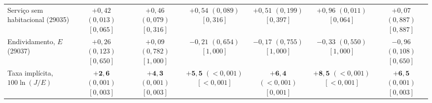 \documentclass[12pt,a4paper]{article}
\begin{document}
\begin{table}[htbp]
{\begin{tabular}{lcccccc}
\makecell[l]{Serviço sem\\habitacional (29035)} & \makecell{$+0{,}42$ $(0{,}013)$\\ \scriptsize$[0{,}065]$} & \makecell{$+0{,}46$ $(0{,}079)$\\ \scriptsize$[0{,}316]$} & \makecell{$+0{,}54$ $(0{,}089)$\\ \scriptsize$[0{,}316]$} & \makecell{$+0{,}51$ $(0{,}199)$\\ \scriptsize$[0{,}397]$} & \makecell{$+0{,}96$ $(0{,}011)$\\ \scriptsize$[0{,}064]$} & \makecell{$+0{,}07$ $(0{,}887)$\\ \scriptsize$[0{,}887]$} \\
\makecell[l]{Endividamento, $E$\\(29037)} & \makecell{$+0{,}26$ $(0{,}123)$\\ \scriptsize$[0{,}650]$} & \makecell{$+0{,}09$ $(0{,}782)$\\ \scriptsize$[1{,}000]$} & \makecell{$-0{,}21$ $(0{,}654)$\\ \scriptsize$[1{,}000]$} & \makecell{$-0{,}17$ $(0{,}755)$\\ \scriptsize$[1{,}000]$} & \makecell{$-0{,}33$ $(0{,}550)$\\ \scriptsize$[1{,}000]$} & \makecell{$-0{,}96$ $(0{,}108)$\\ \scriptsize$[0{,}650]$} \\
\makecell[l]{Taxa implícita,\\$100\ln(J/E)$} & \makecell{$\mathbf{+2{,}6}$ $(0{,}001)$\\ \scriptsize$[0{,}003]$} & \makecell{$\mathbf{+4{,}3}$ $(0{,}001)$\\ \scriptsize$[0{,}003]$} & \makecell{$\mathbf{+5{,}5}$ $(<0{,}001)$\\ \scriptsize$[<0{,}001]$} & \makecell{$\mathbf{+6{,}4}$ $(<0{,}001)$\\ \scriptsize$[0{,}001]$} & \makecell{$\mathbf{+8{,}5}$ $(<0{,}001)$\\ \scriptsize$[<0{,}001]$} & \makecell{$\mathbf{+6{,}5}$ $(0{,}001)$\\ \scriptsize$[0{,}003]$} \\
\bottomrule
\end{tabular}%
}
\end{table}
\end{document}
